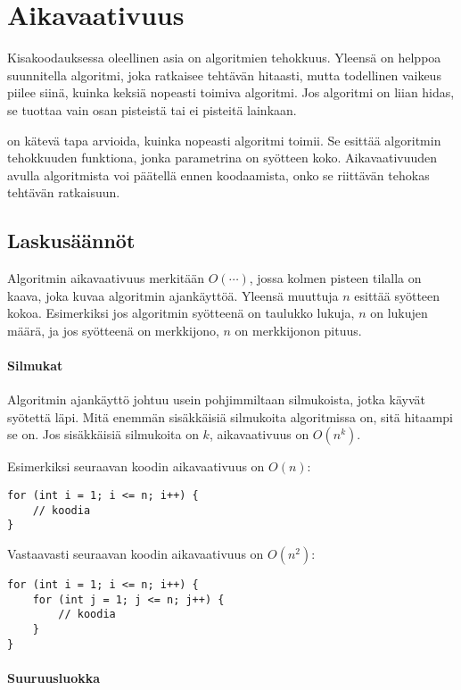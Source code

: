 \chapter{Aikavaativuus}


Kisakoodauksessa oleellinen asia on algoritmien tehokkuus.
Yleensä on helppoa suunnitella algoritmi,
joka ratkaisee tehtävän hitaasti,
mutta todellinen vaikeus piilee siinä,
kuinka keksiä nopeasti toimiva algoritmi.
Jos algoritmi on liian hidas, se tuottaa vain
osan pisteistä tai ei pisteitä lainkaan.

 on kätevä tapa arvioida,
kuinka nopeasti algoritmi toimii.
Se esittää algoritmin tehokkuuden funktiona,
jonka parametrina on syötteen koko.
Aikavaativuuden avulla algoritmista voi päätellä ennen koodaamista,
onko se riittävän tehokas tehtävän ratkaisuun.

\section{Laskusäännöt}

Algoritmin aikavaativuus merkitään $O(\cdots)$,
jossa kolmen pisteen tilalla
on kaava, joka kuvaa algoritmin ajankäyttöä.
Yleensä muuttuja $n$ esittää syötteen kokoa.
Esimerkiksi jos algoritmin syötteenä on taulukko lukuja,
$n$ on lukujen määrä,
ja jos syötteenä on merkkijono,
$n$ on merkkijonon pituus.

\subsubsection*{Silmukat}

Algoritmin ajankäyttö johtuu usein
pohjimmiltaan silmukoista,
jotka käyvät syötettä läpi.
Mitä enemmän sisäkkäisiä silmukoita
algoritmissa on, sitä hitaampi se on.
Jos sisäkkäisiä silmukoita on $k$,
aikavaativuus on $O(n^k)$.

Esimerkiksi seuraavan koodin aikavaativuus on $O(n)$:
\begin{lstlisting}
for (int i = 1; i <= n; i++) {
    // koodia
}
\end{lstlisting}

Vastaavasti seuraavan koodin aikavaativuus on $O(n^2)$:
\begin{lstlisting}
for (int i = 1; i <= n; i++) {
    for (int j = 1; j <= n; j++) {
        // koodia
    }
}
\end{lstlisting}

\subsubsection*{Suuruusluokka}

